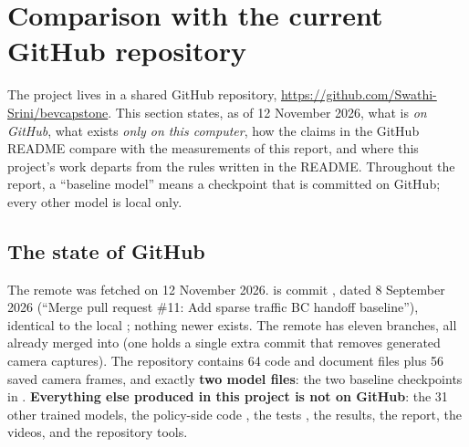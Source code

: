 \section{Comparison with the current GitHub repository}\label{sec:github}

\begin{plainwords}
The project lives in a shared GitHub repository, \url{https://github.com/Swathi-Srini/bevcapstone}. This section states, as of 12 November 2026, what is \emph{on GitHub}, what exists \emph{only on this computer}, how the claims in the GitHub README compare with the measurements of this report, and where this project's work departs from the rules written in the README. Throughout the report, a ``baseline model'' means a checkpoint that is committed on GitHub; every other model is local only.
\end{plainwords}

\subsection{The state of GitHub}
The remote was fetched on 12 November 2026.  is commit , dated 8 September 2026 (``Merge pull request \#11: Add sparse traffic BC handoff baseline''), identical to the local ; nothing newer exists. The remote has eleven branches, all already merged into  (one holds a single extra commit that removes generated camera captures). The repository contains 64 code and document files plus 56 saved camera frames, and exactly \textbf{two model files}: the two baseline checkpoints in .
\textbf{Everything else produced in this project is not on GitHub}: the 31 other trained models, the policy-side code , the tests , the results, the report, the videos, and the repository tools.

